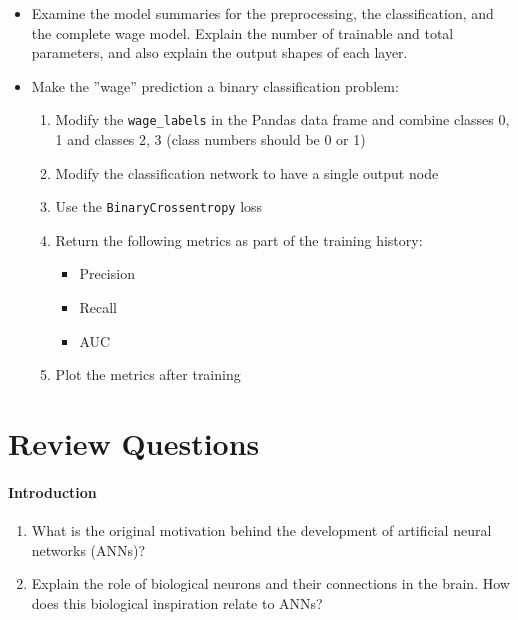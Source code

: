\begin{exercisebox}

\begin{itemize}
   \item Examine the model summaries for the preprocessing, the classification, and the complete wage model. Explain the number of trainable and total parameters, and also explain the output shapes of each layer.
   \item Make the ''wage'' prediction a binary classification problem:
   \begin{enumerate}
      \item Modify the \texttt{wage\_labels} in the Pandas data frame and combine classes 0, 1 and classes 2, 3 (class numbers should be 0 or 1)
      \item Modify the classification network to have a single output node
      \item Use the \texttt{BinaryCrossentropy} loss
      \item Return the following metrics as part of the training history:
      \begin{itemize}
          \item Precision
          \item Recall
          \item AUC
      \end{itemize}
      \item Plot the metrics after training
   \end{enumerate}
\end{itemize}
\end{exercisebox}


\FloatBarrier

\section{Review Questions}

\paragraph*{Introduction}
\begin{enumerate}[nosep]
    \item What is the original motivation behind the development of artificial neural networks (ANNs)?
    \item Explain the role of biological neurons and their connections in the brain. How does this biological inspiration relate to ANNs?
\end{enumerate}
